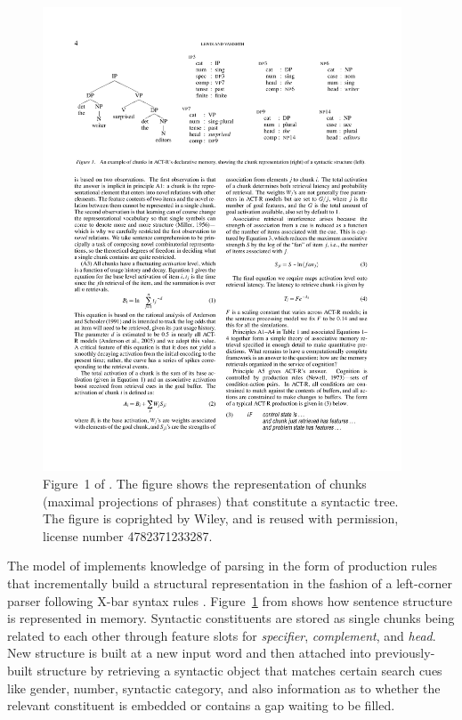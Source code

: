 \documentclass{cambridge7A}\usepackage[]{graphicx}\usepackage[]{color}
\begin{document}
\begin{figure}[htb]
	\centering
	\includegraphics[width=0.95\textwidth]{figures/lv05-fig1-structure}
	\caption{Figure~1 of \cite{LewisVasishth2005}. The figure shows the representation of chunks (maximal projections of phrases) that constitute a syntactic tree. The figure is coprighted by Wiley, and is reused with permission, license number 4782371233287.}
	\label{fig:lv05chunks}
\end{figure}

The model of \cite{LewisVasishth2005} implements knowledge of parsing in the form of production rules that incrementally build a structural representation in the fashion of a left-corner parser following X-bar syntax rules \citep{Chomsky1986}. 
Figure~\ref{fig:lv05chunks} from \cite{LewisVasishth2005} shows how sentence structure is represented in memory. Syntactic constituents are stored as single chunks being related to each other through feature slots for \emph{specifier}, \emph{complement}, and \emph{head}.
New structure is built at a new input word and then attached into previously-built structure by retrieving a syntactic object that matches certain search cues like gender, number, syntactic category, and also information as to whether the relevant constituent is embedded or contains a gap waiting to be filled. 
\end{document}
